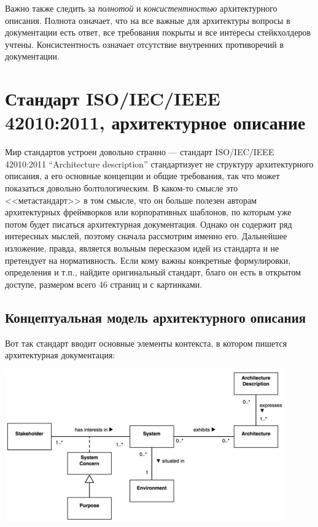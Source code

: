 \documentclass{../mcstext}
\begin{document}
Важно также следить за \emph{полнотой} и \emph{консистентностью} архитектурного описания. Полнота означает, что на все важные для архитектуры вопросы в документации есть ответ, все требования покрыты и все интересы стейкхолдеров учтены. Консистентность означает отсутствие внутренних противоречий в документации.

\section{Стандарт ISO/IEC/IEEE 42010:2011, архитектурное описание}

Мир стандартов устроен довольно странно --- стандарт ISO/IEC/IEEE 42010:2011 ``Architecture description'' стандартизует не структуру архитектурного описания, а его основные концепции и общие требования, так что может показаться довольно болтологическим. В каком-то смысле это <<метастандарт>> в том смысле, что он больше полезен авторам архитектурных фреймворков или корпоративных шаблонов, по которым уже потом будет писаться архитектурная документация. Однако он содержит ряд интересных мыслей, поэтому сначала рассмотрим именно его. Дальнейшее изложение, правда, является вольным пересказом идей из стандарта и не претендует на нормативность. Если кому важны конкретные формулировки, определения и т.п., найдите оригинальный стандарт, благо он есть в открытом доступе, размером всего 46 страниц и с картинками.

\subsection{Концептуальная модель архитектурного описания}

Вот так стандарт вводит основные элементы контекста, в котором пишется архитектурная документация:

\begin{center}
    \includegraphics[width=0.9\textwidth]{ieee42010Context.png}
\end{center}
\end{document}
